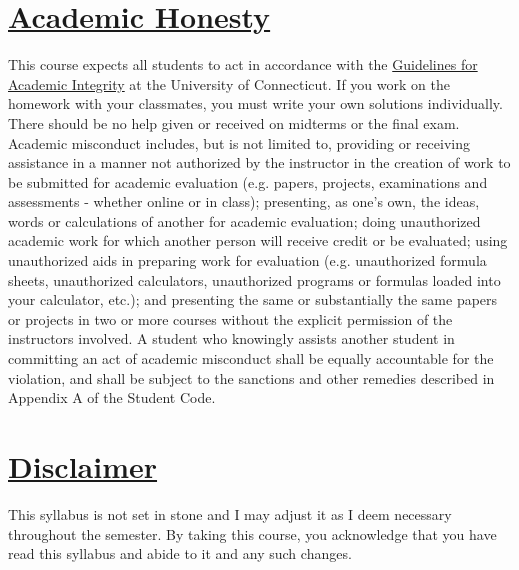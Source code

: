 \documentclass[11pt]{article}
\begin{document}
\section*{\underline{Academic Honesty}}
This course expects all students to act in accordance with the \href{http://community.uconn.edu/the-student-code-appendix-a/}{Guidelines for Academic Integrity} at the University of Connecticut.  If you work on the homework with your classmates, you must write your own solutions individually. There should be no help given or received on midterms or the final exam. Academic misconduct includes, but is not limited to, providing or receiving assistance in a manner not authorized by the instructor in the creation of work to be submitted for academic evaluation (e.g. papers, projects, examinations and assessments - whether online or in class); presenting, as one's own, the ideas, words or calculations of another for academic evaluation; doing unauthorized academic work for which another person will receive credit or be evaluated; using unauthorized aids in preparing work for evaluation (e.g. unauthorized formula sheets, unauthorized calculators, unauthorized programs or formulas loaded into your calculator, etc.); and presenting the same or substantially the same papers or projects in two or more courses without the explicit permission of the instructors involved. A student who knowingly assists another student in committing an act of academic misconduct shall be equally accountable for the violation, and shall be subject to the sanctions and other remedies described in Appendix A of the Student Code. 
\newpage
\section*{\underline{Disclaimer}}
This syllabus is not set in stone and I may adjust it as I deem necessary throughout
the semester. By taking this course, you acknowledge that you have read this syllabus and abide
to it and any such changes.
\end{document}
